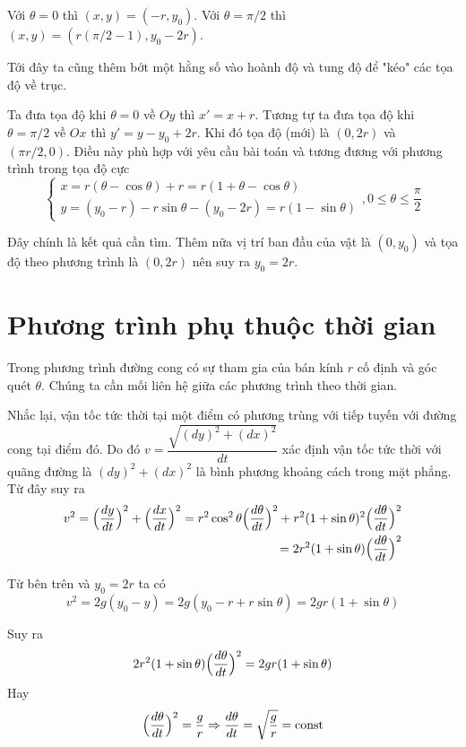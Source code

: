 \documentclass{mynotes}
\theoremstyle{definition}
\begin{document}
Với $\theta = 0$ thì $(x, y) = (-r, y_0)$. Với $\theta = \pi / 2$ thì $(x, y) = (r (\pi / 2 - 1), y_0 - 2r)$.

Tới đây ta cũng thêm bớt một hằng số vào hoành độ và tung độ để "kéo" các tọa độ về trục.

Ta đưa tọa độ khi $\theta = 0$ về $Oy$ thì $x' = x + r$. Tương tự ta đưa tọa độ khi $\theta = \pi / 2$ về $Ox$ thì $y' = y - y_0 + 2r$. Khi đó tọa độ (mới) là $(0, 2r)$ và $(\pi r / 2, 0)$. Điều này phù hợp với yêu cầu bài toán và tương đương với phương trình trong tọa độ cực 
\begin{equation}
    \begin{cases}
        x = r (\theta - \cos\theta) + r = r (1 + \theta - \cos\theta) \\
        y = (y_0 - r) - r \sin\theta - (y_0 - 2r) = r (1 - \sin\theta)
    \end{cases}, 0 \leq \theta \leq \frac{\pi}{2}
\end{equation}

Đây chính là kết quả cần tìm. Thêm nữa vị trí ban đầu của vật là $(0, y_0)$ và tọa độ theo phương trình là $(0, 2r)$ nên suy ra $y_0 = 2r$.

\section*{Phương trình phụ thuộc thời gian}

Trong phương trình đường cong có sự tham gia của bán kính $r$ cố định và góc quét $\theta$. Chúng ta cần mối liên hệ giữa các phương trình theo thời gian.

Nhắc lại, vận tốc tức thời tại một điểm có phương trùng với tiếp tuyến với đường cong tại điểm đó. Do đó $v = \dfrac{\sqrt{(dy)^2 + (dx)^2}}{dt}$ xác định vận tốc tức thời với quãng đường là $(dy)^2 + (dx)^2$ là bình phương khoảng cách trong mặt phẳng. Từ đây suy ra
\begin{align*}
    v^2 = \Bigl(\frac{dy}{dt}\Bigr)^2 + \Bigl(\frac{dx}{dt}\Bigr)^2 = r^2 \cos^2 \theta \Bigl( \frac{d \theta}{dt} \Bigr)^2 + r^2 (1 + \sin \theta)^2 \Bigl( \frac{d \theta}{dt} \Bigr)^2 \\ = 2 r^2 (1 + \sin \theta) \Bigl( \frac{d \theta}{dt} \Bigr)^2
\end{align*}

Từ bên trên và $y_0 = 2r$ ta có \[v^2 = 2 g (y_0 - y) = 2 g (y_0 - r + r \sin \theta) = 2 g r ( 1 + \sin \theta)\]

Suy ra
\begin{equation*}
    2 r^2 (1 + \sin \theta) \Bigl( \frac{d \theta}{dt} \Bigr)^2 = 2 g r (1 + \sin \theta)
\end{equation*}
Hay
\begin{equation}
    \Bigl(\frac{d \theta}{dt}\Bigr)^2 = \frac{g}{r} \Rightarrow \frac{d \theta}{dt} = \sqrt{\frac{g}{r}} = \text{const}
\end{equation}
\end{document}
